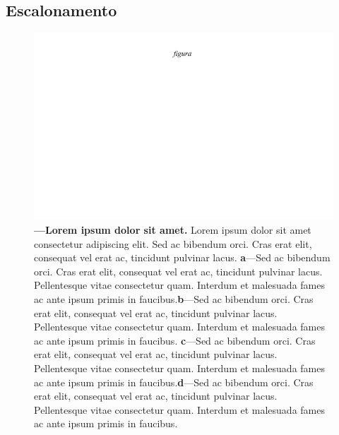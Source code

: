 \documentclass[./main.tex]{subfiles}
\begin{document}
\subsection{Escalonamento}

\begin{figure}[t!] 
\centering				
\includegraphics[width=0.98\linewidth]{figs/fig_m.jpg}		
\caption[Lorem ipsum dolor sit amet]
{\textbf{---\;Lorem ipsum dolor sit amet.}
    Lorem ipsum dolor sit amet consectetur adipiscing elit. Sed ac bibendum orci. Cras erat elit, consequat vel erat ac, tincidunt pulvinar lacus. \;\textbf{a}\;---\;Sed ac bibendum orci. Cras erat elit, consequat vel erat ac, tincidunt pulvinar lacus. Pellentesque vitae consectetur quam. Interdum et malesuada fames ac ante ipsum primis in faucibus.\;\textbf{b}\;---\;Sed ac bibendum orci. Cras erat elit, consequat vel erat ac, tincidunt pulvinar lacus. Pellentesque vitae consectetur quam. Interdum et malesuada fames ac ante ipsum primis in faucibus. \;\textbf{c}\;---\;Sed ac bibendum orci. Cras erat elit, consequat vel erat ac, tincidunt pulvinar lacus. Pellentesque vitae consectetur quam. Interdum et malesuada fames ac ante ipsum primis in faucibus.\;\textbf{d}\;---\;Sed ac bibendum orci. Cras erat elit, consequat vel erat ac, tincidunt pulvinar lacus. Pellentesque vitae consectetur quam. Interdum et malesuada fames ac ante ipsum primis in faucibus.
}
\label{fig:hydro:scaling} 		
\end{figure}
\end{document}

